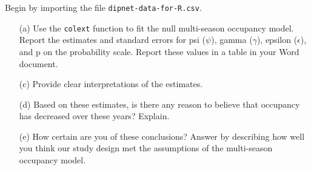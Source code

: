 \documentclass[12pt]{article}\usepackage[]{graphicx}\usepackage[]{color}
\begin{document}
Begin by importing the file \texttt{dipnet-data-for-R.csv}.

\begin{enumerate}
  \item[(a)] Use the \texttt{colext} function to fit the null
    multi-season occupancy model. Report the estimates and standard
    errors for psi ($\psi$), gamma ($\gamma$), epsilon ($\epsilon$),
    and p on the probability scale. Report these values in a table in
    your Word document.   
  \item[(c)] Provide clear interpretations of the estimates. 
  \item[(d)] Based on these estimates, is there any reason to believe
    that occupancy has decreased over these years? Explain. 
  \item[(e)] How certain are you of these conclusions? Answer by
    describing how well you think our study design met the assumptions
    of the multi-season occupancy model. 
\end{enumerate}
\end{document}
